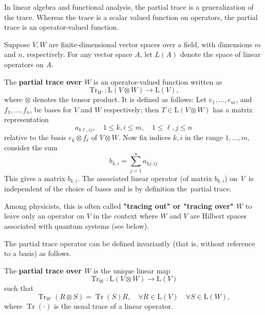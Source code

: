 
In linear algebra and functional analysis, the partial trace is a generalization of the trace. 
Whereas the trace is a scalar valued function on operators, the partial trace is an operator-valued function.

Suppose $V, W$ are finite-dimensional vector spaces over a field, with dimensions $m$ and $n$, respectively. 
For any vector space $A$, let $L(A)$ denote the space of linear operators on $A$.

\begin{definition}\label{defn:partial-trace-1}
The \textbf{partial trace over $W$} is an operator-valued function written as
$$
\operatorname{Tr}_W: \mathrm{L}(V \otimes W) \rightarrow \mathrm{L}(V),
$$
where $\otimes$ denotes the tensor product. It is defined as follows: Let $e_1, \ldots, e_m$, and $f_1, \ldots, f_n$, be bases for $V$ and $W$ respectively; then $T \in \mathrm{L}(V \otimes W)$ has a matrix representation
$$
a_{k \ell, i j}, \quad 1 \leq k, i \leq m, \quad 1 \leq \ell, j \leq n
$$
relative to the basis $e_k \otimes f_{\ell}$ of $V \otimes W$. Now fix indices $k, i$ in the range $1, \ldots, m$, consider the sum
$$
b_{k, i}=\sum_{j=1}^n a_{k j, i j}
$$
This gives a matrix $b_{k, i}$. The associated linear operator (of matrix $b_{k, i}$) on \textit{V} is independent of the choice of bases and is by definition the partial trace.
\end{definition}

Among physicists, this is often called \textbf{"tracing out" or "tracing over" $W$} to leave only an operator on $V$ in the context where $W$ and $V$ are Hilbert spaces associated with quantum systems (see below).

The partial trace operator can be defined invariantly (that is, without reference to a basis) as follows.

\begin{definition}
The \textbf{partial trace over $W$} is the unique linear map
$$
\operatorname{Tr}_W: \mathrm{L}(V \otimes W) \rightarrow \mathrm{L}(V)
$$
such that
\begin{equation}\label{eq:partial-trace-defn}
    \operatorname{Tr}_W(R \otimes S)=\operatorname{Tr}(S) R, \quad \forall R \in \mathrm{L}(V) \quad \forall S \in \mathrm{L}(W),
\end{equation}
where $\operatorname{Tr}(\cdot)$ is the usual trace of a linear operator.
\end{definition}

